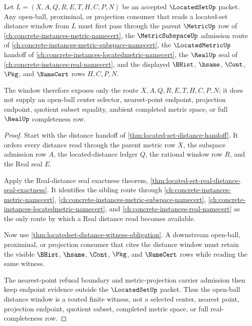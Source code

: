\begin{theorem}
\label{thm:located-set-open-ball-distance-window}
Let $L=(X,A,Q,R,E,T,H,C,P,N)$ be an accepted $\LocatedSetUp$ packet. Any open-ball, proximinal, or projection consumer that reads a located-set distance window from $L$ must first pass through the parent $\MetricUp$ row of \autoref{ch:concrete-instances-metric-namecert}, the $\MetricSubspaceUp$ admission route of \autoref{ch:concrete-instances-metric-subspace-namecert}, the $\LocatedMetricUp$ handoff of \autoref{ch:concrete-instances-locatedmetric-namecert}, the $\RealUp$ seal of \autoref{ch:concrete-instances-real-namecert}, and the displayed $\BHist$, $\hsame$, $\Cont$, $\Pkg$, and $\NameCert$ rows $H,C,P,N$.

The window therefore exposes only the route $X,A,Q,R,E,T,H,C,P,N$; it does not supply an open-ball center selector, nearest-point endpoint, projection endpoint, quotient subset equality, ambient completed metric space, or full $\RealUp$ completeness row.
\end{theorem}
\begin{proof}
Start with the distance handoff of \autoref{thm:located-set-distance-handoff}. It orders every distance read through the parent metric row $X$, the subspace admission row $A$, the located-distance ledger $Q$, the rational window row $R$, and the Real seal $E$.

Apply the Real-distance seal exactness theorem, \autoref{thm:located-set-real-distance-seal-exactness}. It identifies the sibling route through \autoref{ch:concrete-instances-metric-namecert}, \autoref{ch:concrete-instances-metric-subspace-namecert}, \autoref{ch:concrete-instances-locatedmetric-namecert}, and \autoref{ch:concrete-instances-real-namecert} as the only route by which a Real distance read becomes available.

Now use \autoref{thm:locatedset-distance-witness-obligation}. A downstream open-ball, proximinal, or projection consumer that cites the distance window must retain the visible $\BHist$, $\hsame$, $\Cont$, $\Pkg$, and $\NameCert$ rows while reading the same witness.

The nearest-point refusal boundary and metric-projection carrier admission then keep endpoint evidence outside the $\LocatedSetUp$ packet. Thus the open-ball distance window is a routed finite witness, not a selected center, nearest point, projection endpoint, quotient subset, completed metric space, or full real-completeness row.
\end{proof}

